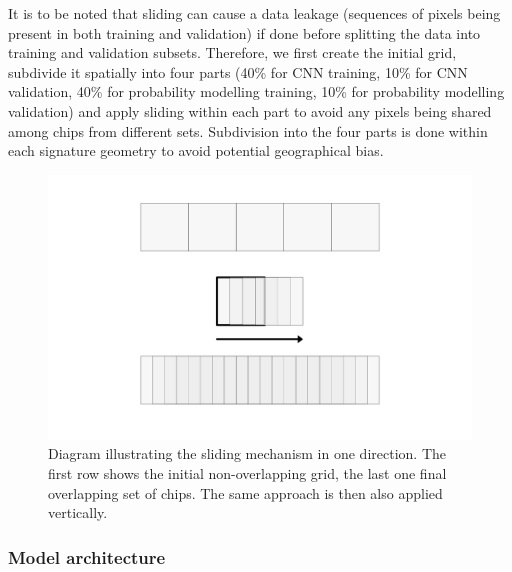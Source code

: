 \documentclass[]{interact}
\theoremstyle{plain}%
\theoremstyle{definition}
\theoremstyle{remark}
\begin{document}
It is to be noted that sliding can cause a data leakage (sequences of pixels being
present in both training and validation) if done before splitting the data into
training and validation subsets. Therefore, we first create the initial grid, subdivide
it spatially into four parts (40\% for CNN training, 10\% for CNN validation, 40\% for
probability modelling training, 10\% for probability modelling validation) and apply
sliding within each part to avoid any pixels being shared among chips from different
sets. Subdivision into the four parts is done within each signature geometry to avoid
potential geographical bias.

\begin{figure}
    \centering
    \includegraphics[width=.8\linewidth]{fig/sliding.png}
    \caption{Diagram illustrating the sliding mechanism in one direction. The first row shows the initial non-overlapping grid, the last one final overlapping set of chips. The same approach is then also applied vertically.}
    \label{fig:sliding}
\end{figure}


\subsubsection{Model architecture}


\end{document}

